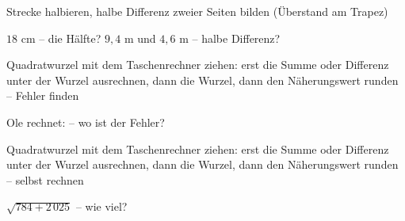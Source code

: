 \begin{aufgabe}{Strecke halbieren, halbe Differenz zweier Seiten bilden (Überstand am Trapez)}
\begin{teile}
\teil $18$ cm – die Hälfte? \leerfeld[cm]
\teil $9{,}4$ m und $4{,}6$ m – halbe Differenz? \leerfeld[m]
\end{teile}
\end{aufgabe}

\begin{aufgabe}{Quadratwurzel mit dem Taschenrechner ziehen: erst die Summe oder Differenz unter der Wurzel ausrechnen, dann die Wurzel, dann den Näherungswert runden – Fehler finden}
\begin{teile}
\teil Ole rechnet:  – wo ist der Fehler?
\end{teile}
\end{aufgabe}

\begin{aufgabe}{Quadratwurzel mit dem Taschenrechner ziehen: erst die Summe oder Differenz unter der Wurzel ausrechnen, dann die Wurzel, dann den Näherungswert runden – selbst rechnen}
\begin{teile}
\teil $\sqrt{784 + 2\,025}$ – wie viel? \leerfeld
\end{teile}
\end{aufgabe}
